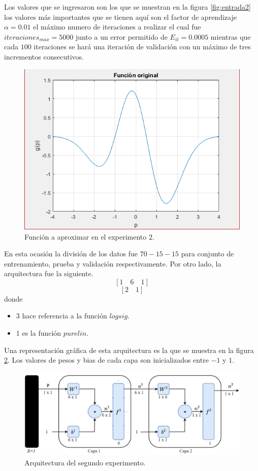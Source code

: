 Los valores que se ingresaron son los que se muestran en la figura \ref{fig:entrada2} los valores más importantes que se tienen aquí son el factor de aprendizaje $\alpha=0.01$ el máximo numero de iteraciones a realizar el cual fue $iteraciones_{max} = 5000$ junto a un error permitido de $E_{it} = 0.0005$ mientras que cada $100$ iteraciones se hará una iteración de validación con un máximo de tres incrementos consecutivos.
\begin{figure}[H]
    \begin{center}
        \includegraphics[width=12cm]{2/original.png}
        \caption{Función a aproximar en el experimento 2.}
        \label{fig:original2}
    \end{center}
\end{figure}
En esta ocasión la división de los datos fue $70-15-15$ para conjunto de entrenamiento, prueba y validación respectivamente. Por otro lado, la arquitectura fue la siguiente.
\[ \left[ 1 \quad 6 \quad 1 \right] \]
\[ \left[ 2 \quad 1 \right] \]
donde
\begin{itemize}
    \item $3$ hace referencia a la función $logsig$.
    \item $1$ es la función $purelin$.
\end{itemize}
Una representación gráfica de esta arquitectura es la que se muestra en la figura \ref{fig:arqui2}. Los valores de pesos y bias de cada capa son inicializados entre $-1$ y $1$.
\begin{figure}[H]
    \begin{center}
        \includegraphics[width=14cm]{img/arqui1.png}
        \caption{Arquitectura del segundo experimento.}
        \label{fig:arqui2}
    \end{center}
\end{figure}
